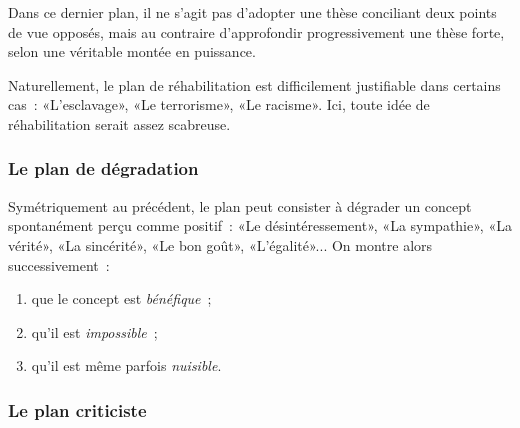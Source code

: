 \documentclass[a4paper,11pt]{article}
\begin{document}
\par

Dans ce dernier plan, il ne s'agit pas d'adopter une thèse conciliant
deux points de vue opposés, mais au contraire d'approfondir
progressivement une thèse forte, selon une véritable montée en
puissance. 

\par

Naturellement, le plan de réhabilitation est difficilement justifiable
dans certains cas~: «L'esclavage», «Le terrorisme», «Le racisme». Ici,
toute idée de réhabilitation serait assez scabreuse.


\subsubsection{Le plan de dégradation}

Symétriquement au précédent, le plan peut consister à dégrader un
concept spontanément perçu comme positif~: «Le désintéressement», «La
sympathie», «La vérité», «La sincérité», «Le bon goût»,
«L'égalité»... On montre alors successivement~:
\begin{enumerate}
\item que le concept est \emph{bénéfique}~;
\item qu'il est \emph{impossible}~;
\item qu'il est même parfois \emph{nuisible}.
\end{enumerate}



\subsubsection{Le plan criticiste}
\end{document}
